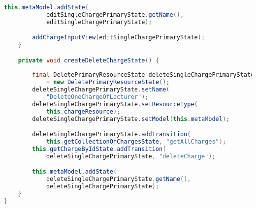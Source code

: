\begin{lstlisting}[label=lst:enfield_model,
language=java,
firstnumber=1,
caption=Beschreibung des \textit{Enfield-Modell} der Referenzimplementierung. ]
		this.metaModel.addState(
			editSingleChargePrimaryState.getName(), 
			editSingleChargePrimaryState);

		addChargeInputView(editSingleChargePrimaryState);
	}

	private void createDeleteChargeState() {
	
		final DeletePrimaryResourceState deleteSingleChargePrimaryState 
			= new DeletePrimaryResourceState();
		deleteSingleChargePrimaryState.setName(
			"DeleteOneChargeOfLecturer");
		deleteSingleChargePrimaryState.setResourceType(
			this.chargeResource);
		deleteSingleChargePrimaryState.setModel(this.metaModel);

		deleteSingleChargePrimaryState.addTransition(
			this.getCollectionOfChargesState, "getAllCharges");
		this.getChargeByIdState.addTransition(
			deleteSingleChargePrimaryState, "deleteCharge");

		this.metaModel.addState(
			deleteSingleChargePrimaryState.getName(), 
			deleteSingleChargePrimaryState);
	}
}
\end{lstlisting}

\newpage

